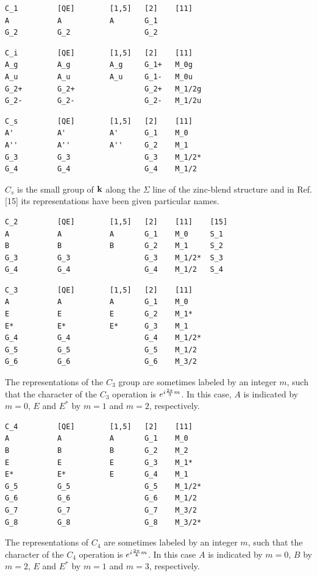 \documentclass[12pt,a4paper]{article}
\begin{document}
\begin{verbatim}
C_1         [QE]        [1,5]   [2]    [11]
A           A           A       G_1             
G_2         G_2                 G_2              
\end{verbatim}

\begin{verbatim}
C_i         [QE]        [1,5]   [2]    [11] 
A_g         A_g         A_g     G_1+   M_0g
A_u         A_u         A_u     G_1-   M_0u
G_2+        G_2+                G_2+   M_1/2g
G_2-        G_2-                G_2-   M_1/2u
\end{verbatim}

\begin{verbatim}
C_s         [QE]        [1,5]   [2]    [11] 
A'          A'          A'      G_1    M_0
A''         A''         A''     G_2    M_1
G_3         G_3                 G_3    M_1/2*
G_4         G_4                 G_4    M_1/2
\end{verbatim}

$C_s$ is the small group of ${\bf k}$ along the $\Sigma$ line of the 
zinc-blend structure and in Ref.[15] its representations have been given
particular names.
\begin{verbatim}
C_2         [QE]        [1,5]   [2]    [11]    [15]  
A           A           A       G_1    M_0     S_1
B           B           B       G_2    M_1     S_2
G_3         G_3                 G_3    M_1/2*  S_3
G_4         G_4                 G_4    M_1/2   S_4
\end{verbatim}

\begin{verbatim}
C_3         [QE]        [1,5]   [2]    [11]
A           A           A       G_1    M_0
E           E           E       G_2    M_1*
E*          E*          E*      G_3    M_1
G_4         G_4                 G_4    M_1/2*
G_5         G_5                 G_5    M_1/2
G_6         G_6                 G_6    M_3/2
\end{verbatim}
The representations of the $C_3$ group are sometimes labeled by an integer 
$m$, such that the character of the $C_3$ operation is 
$e^{i {2\pi \over 3} m}$. In this case, $A$ is indicated by $m=0$, $E$ and 
$E^*$ by $m=1$ and $m=2$, respectively.

\begin{verbatim}
C_4         [QE]        [1,5]   [2]    [11]
A           A           A       G_1    M_0
B           B           B       G_2    M_2
E           E           E       G_3    M_1*
E*          E*          E       G_4    M_1
G_5         G_5                 G_5    M_1/2*
G_6         G_6                 G_6    M_1/2
G_7         G_7                 G_7    M_3/2 
G_8         G_8                 G_8    M_3/2*
\end{verbatim}
The representations of $C_4$ are sometimes labeled by an integer $m$,
such that the character of the $C_4$ operation is $e^{i {2\pi \over 4} m}$.
In this case $A$ is indicated by $m=0$, $B$ by $m=2$, $E$ and $E^*$ 
by $m=1$ and $m=3$, respectively.
\end{document}
